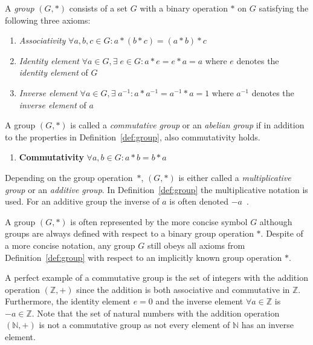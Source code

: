 \begin{defn}[Group]
\label{def:group}
 A \textit{group} $\left( G, * \right)$ consists of a set $G$ with a binary operation $*$ on $G$ satisfying the following three axioms:
 \begin{enumerate}
  \item \textit{Associativity} $\forall a, b, c \in G: a*(b*c) = (a*b)*c$
  \item \textit{Identity element} $\forall a \in G, \exists \; e \in G: a*e = e*a = a $ where $e$ denotes the \textit{identity element} of $G$
  \item \textit{Inverse element} $\forall a \in G, \exists \; a^{-1}: a*a^{-1} = a^{-1}*a = 1$ where $a^{-1}$ denotes the \textit{inverse element} of $a$
  \setcounter{enumTemp}{\theenumi}
 \end{enumerate}

\end{defn}

\begin{defn}
 A group $\left( G, * \right)$ is called a \textit{commutative group} or an \textit{abelian group} if in addition to the properties in Definition~\ref{def:group}, also commutativity holds.
 \begin{enumerate}
  \setcounter{enumi}{\theenumTemp}
  \item \textbf{Commutativity} $\forall a, b \in G: a*b = b*a$
 \end{enumerate}

\end{defn}

Depending on the group operation~$*$, $\left( G, * \right)$ is either called a \textit{multiplicative group} or an \textit{additive group}. In Definition~\ref{def:group} the multiplicative notation is used. For an additive group  the inverse of $a$ is often denoted $- a$~\cite{book:handbook_of_applied_cryptography}. 

A group $\left( G, * \right)$ is often represented by the more concise symbol $G$ although groups are always defined with respect to a binary group operation $*$. Despite of a more concise notation, any group $G$ still obeys all axioms from Definition~\ref{def:group} with respect to an implicitly known group operation $*$.

A perfect example of a commutative group is the set of integers with the addition operation $\left( \mathbb{Z}, + \right)$ since the addition is both associative and commutative in $\mathbb{Z}$. Furthermore, the identity element $e = 0$ and the inverse element $\forall a \in \mathbb{Z}$ is $-a \in \mathbb{Z}$. Note that the set of natural numbers with the addition operation $\left( \mathbb{N}, + \right)$ is not a commutative group as not every element of $\mathbb{N}$ has an inverse element.

